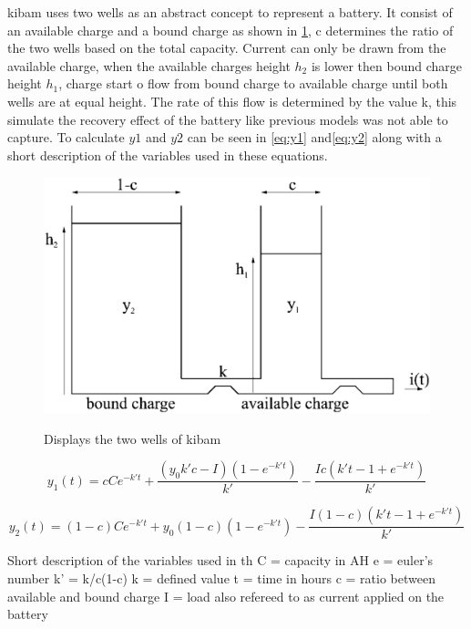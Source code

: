 \gls{kibam} uses two wells as an abstract concept to represent a battery. It consist of an available charge and a bound charge as shown in \cref{fig:kibam_wells}, c determines the ratio of the two wells based on the total capacity. Current can only be drawn from the available charge, when the available charges height $h_2$ is lower then bound charge height $h_1$, charge start o flow from bound charge to available charge until both wells are at equal height. The rate of this flow is determined by the value k, this simulate the recovery effect of the battery like previous models was not able to capture. To calculate $y{1}$ and $y{2}$ can be seen in \cref{eq:y1} and\cref{eq:y2} along with a short description of the variables used in these equations. 

\begin{figure}
	\center
	\includegraphics[width=\textwidth/2]{graphics/kibam.jpg}
	\label{fig:kibam_wells}
	\caption{Displays the two wells of \gls{kibam}}
\end{figure}

\begin{equation}\label{eq:y1}
y_1(t) = cCe^{-k't}+\frac{(y_0k'c-I)(1-e^{-k't})}{k'}-\frac{Ic(k't-1+e^{-k't})}{k'}
\end{equation}

\begin{equation}\label{eq:y2}
y_2(t) = (1-c)Ce^{-k't}+y_0(1-c)(1-e^{-k't})-\frac{I(1-c)(k't-1+e^{-k't})}{k'}
\end{equation}

Short description of the variables used in th
C = capacity in AH
e = euler's number
k' = k/c(1-c)
k = defined value
t = time in hours
c = ratio between available and bound charge
I = load also refereed to as current applied on the battery

